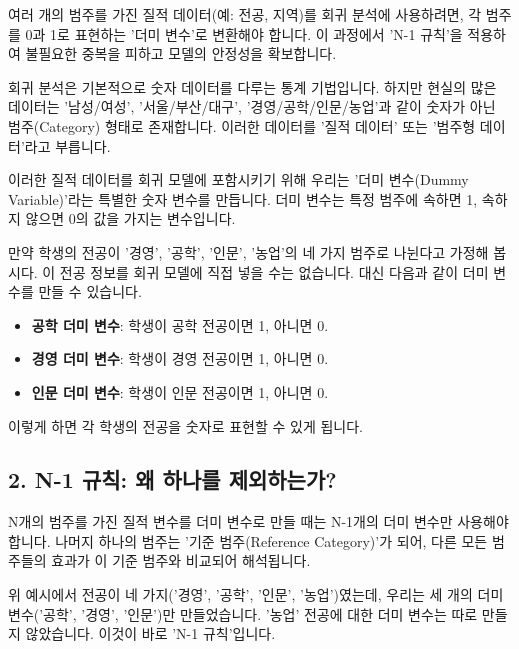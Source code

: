 \documentclass[11pt,a4paper]{article}
\theoremstyle{definition}
\begin{document}
\begin{tcolorbox}[definition={핵심 요약: 다중 범주 더미 변수}]
여러 개의 범주를 가진 질적 데이터(예: 전공, 지역)를 회귀 분석에 사용하려면, 각 범주를 0과 1로 표현하는 '더미 변수'로 변환해야 합니다. 이 과정에서 'N-1 규칙'을 적용하여 불필요한 중복을 피하고 모델의 안정성을 확보합니다.
\end{tcolorbox}

회귀 분석은 기본적으로 숫자 데이터를 다루는 통계 기법입니다. 하지만 현실의 많은 데이터는 '남성/여성', '서울/부산/대구', '경영/공학/인문/농업'과 같이 숫자가 아닌 범주(Category) 형태로 존재합니다. 이러한 데이터를 '질적 데이터' 또는 '범주형 데이터'라고 부릅니다.

이러한 질적 데이터를 회귀 모델에 포함시키기 위해 우리는 '더미 변수(Dummy Variable)'라는 특별한 숫자 변수를 만듭니다. 더미 변수는 특정 범주에 속하면 1, 속하지 않으면 0의 값을 가지는 변수입니다.

\begin{examplebox}[title={예시: 전공 데이터를 더미 변수로 변환}]
만약 학생의 전공이 '경영', '공학', '인문', '농업'의 네 가지 범주로 나뉜다고 가정해 봅시다. 이 전공 정보를 회귀 모델에 직접 넣을 수는 없습니다. 대신 다음과 같이 더미 변수를 만들 수 있습니다.

\begin{itemize}
    \item \textbf{공학 더미 변수}: 학생이 공학 전공이면 1, 아니면 0.
    \item \textbf{경영 더미 변수}: 학생이 경영 전공이면 1, 아니면 0.
    \item \textbf{인문 더미 변수}: 학생이 인문 전공이면 1, 아니면 0.
\end{itemize}
이렇게 하면 각 학생의 전공을 숫자로 표현할 수 있게 됩니다.
\end{examplebox}

\subsection{2. N-1 규칙: 왜 하나를 제외하는가?}

\begin{tcolorbox}[definition={핵심 요약: N-1 규칙}]
N개의 범주를 가진 질적 변수를 더미 변수로 만들 때는 N-1개의 더미 변수만 사용해야 합니다. 나머지 하나의 범주는 '기준 범주(Reference Category)'가 되어, 다른 모든 범주들의 효과가 이 기준 범주와 비교되어 해석됩니다.
\end{tcolorbox}

위 예시에서 전공이 네 가지('경영', '공학', '인문', '농업')였는데, 우리는 세 개의 더미 변수('공학', '경영', '인문')만 만들었습니다. '농업' 전공에 대한 더미 변수는 따로 만들지 않았습니다. 이것이 바로 'N-1 규칙'입니다.
\end{document}
